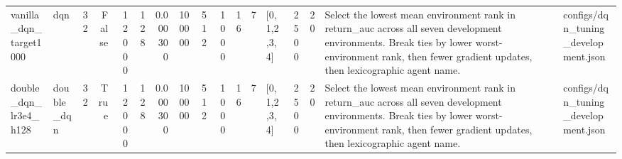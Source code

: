 \begin{table}
\begin{tabular}{llrrrrrrrrrrlrrll}
vanilla\_dqn\_target1000 & dqn & 32 & False & 12000 & 128 & 0.000300 & 100000 & 512 & 1000 & 16 & 7 & [0,1,2,3,4] & 2500 & 20 & Select the lowest mean environment rank in return\_auc across all seven development environments. Break ties by lower worst-environment rank, then fewer gradient updates, then lexicographic agent name. & configs/dqn\_tuning\_development.json \\
double\_dqn\_lr3e4\_h128 & double\_dqn & 32 & True & 12000 & 128 & 0.000300 & 100000 & 512 & 1000 & 16 & 7 & [0,1,2,3,4] & 2500 & 20 & Select the lowest mean environment rank in return\_auc across all seven development environments. Break ties by lower worst-environment rank, then fewer gradient updates, then lexicographic agent name. & configs/dqn\_tuning\_development.json \\
\bottomrule
\end{tabular}
\end{table}
